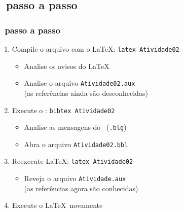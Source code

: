 \documentclass[handout,10pt]{beamer}
\begin{document}
\subsection{\bibtex\ passo a passo}
\begin{frame}[fragile]\footnotesize
	\frametitle{\bibtex\ passo a passo}

	\begin{atividade}{3}
		\begin{enumerate}
			\item<2-> Compile o arquivo com o \LaTeX: \verb|latex Atividade02|
			
				\begin{itemize}
					\item<3-> Analise os avisos do \LaTeX
					\item<4-> Analise o arquivo \texttt{Atividade02.aux}\\
					(as referências ainda são desconhecidas)
				\end{itemize}
			
			\item<5-> Execute o \bibtex: \verb|bibtex Atividade02|
				
				\begin{itemize}
					\item<6-> Analise as mensagens do \bibtex\ (\texttt{.blg})
					\item<7-> Abra o arquivo \texttt{Atividade02.bbl}
				\end{itemize}
				
			\item<8-> Reexecute \LaTeX: \verb|latex Atividade02|
			
				\begin{itemize}
					\item<9-> Reveja o arquivo \texttt{Atividade.aux}\\
						(as referências agora são conhecidas)
				\end{itemize}
						
			\item<10-> Execute o \LaTeX\ novamente
		\end{enumerate}
	\end{atividade}
\end{frame}
\end{document}
